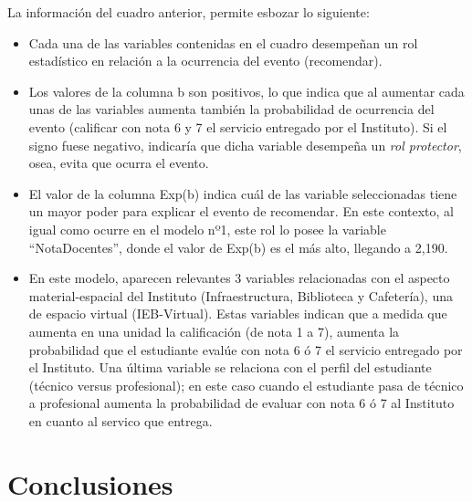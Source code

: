 \documentclass[]{book}
\begin{document}
La información del cuadro anterior, permite esbozar lo siguiente:

\begin{itemize}
\item
  Cada una de las variables contenidas en el cuadro desempeñan un rol
  estadístico en relación a la ocurrencia del evento (recomendar).
\item
  Los valores de la columna b son positivos, lo que indica que al
  aumentar cada unas de las variables aumenta también la probabilidad de
  ocurrencia del evento (calificar con nota 6 y 7 el servicio entregado
  por el Instituto). Si el signo fuese negativo, indicaría que dicha
  variable desempeña un \emph{rol protector}, osea, evita que ocurra el
  evento.
\item
  El valor de la columna Exp(b) indica cuál de las variable
  seleccionadas tiene un mayor poder para explicar el evento de
  recomendar. En este contexto, al igual como ocurre en el modelo nº1,
  este rol lo posee la variable ``NotaDocentes'', donde el valor de
  Exp(b) es el más alto, llegando a 2,190.
\item
  En este modelo, aparecen relevantes 3 variables relacionadas con el
  aspecto material-espacial del Instituto (Infraestructura, Biblioteca y
  Cafetería), una de espacio virtual (IEB-Virtual). Estas variables
  indican que a medida que aumenta en una unidad la calificación (de
  nota 1 a 7), aumenta la probabilidad que el estudiante evalúe con nota
  6 ó 7 el servicio entregado por el Instituto. Una última variable se
  relaciona con el perfil del estudiante (técnico versus profesional);
  en este caso cuando el estudiante pasa de técnico a profesional
  aumenta la probabilidad de evaluar con nota 6 ó 7 al Instituto en
  cuanto al servico que entrega.
\end{itemize}

\chapter{Conclusiones}\label{conclusiones}
\end{document}
